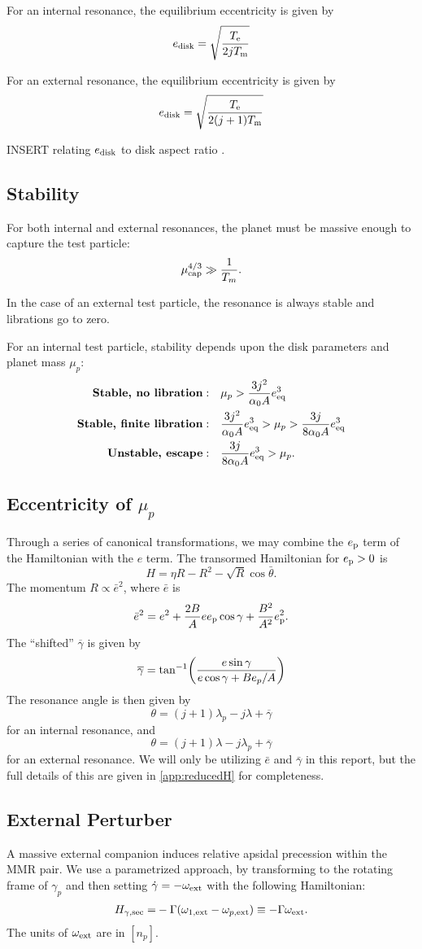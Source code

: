\documentclass{article}
\newcommand{\note}[1]{{\color{red} #1 }}
\newcommand{\edisk}{e_{\rm disk}}
\newcommand{\omext}{\omega_{\rm ext}}
\newcommand{\ep}{e_{\rm p}}
\newcommand{\Te}{T_{\rm e}}
\newcommand{\Tm}{T_{\rm m}}
\newcommand{\ebar}{\bar{e}}
\newcommand{\gammabar}{\bar{\gamma}}
\DeclarePairedDelimiter{\p}{(}{)}
\begin{document}
For an internal resonance, the equilibrium eccentricity is given by
\[ \edisk = \sqrt{\frac{\Te}{2j \Tm}} \]

For an external resonance, the equilibrium eccentricity is given by
\[ \edisk = \sqrt{\frac{\Te}{2(j+1) \Tm}} \]

\note{INSERT relating $e_{\rm disk}$ to disk aspect ratio}.

\subsection{Stability}
For both internal and external resonances, the planet must be massive enough
to capture the test particle:
\[\mu_{\rm cap}^{4/3}\gg \frac{1}{T_m}.\]

In the case of an external test particle, the resonance is always stable
and librations go to zero.

For an internal test particle, stability depends upon the disk parameters
and planet mass $\mu_p$:
\begin{align}
  \label{eq:stability}
\textbf{Stable, no libration}:&\quad \mu_p > \frac{3j^2}{\alpha_0 A} e_{\rm eq}^3 \nonumber\\
\textbf{Stable, finite libration}:&\quad \frac{3j^2}{\alpha_0 A} e_{\rm
 eq}^3 > \mu_p > \frac{3j}{8\alpha_0 A} e_{\rm eq}^3\nonumber\\
\textbf{Unstable, escape}:&\quad \frac{3j}{8\alpha_0 A} e_{\rm eq}^3 > \mu_p.
\end{align}

\subsection{Eccentricity of $\mu_p$}
Through a series of canonical transformations, we may combine the $\ep$
term of the Hamiltonian with the $e$ term.
The transormed Hamiltonian for $\ep > 0$ is
\[ H = \eta R - R^2 - \sqrt{R}\cos\bar{\theta}. \]
The momentum $R\propto \ebar^2$, where $\ebar$ is
\[ \ebar^2 = e^2 + \frac{2B}{A}e\ep\cos\gamma + \frac{B^2}{A^2}\ep^2. \]
The ``shifted'' $\overline{\gamma}$ is given by
\[ \overline{\gamma} = \tan^{-1}\p*{\frac{e\sin\gamma}{e\cos\gamma + Be_p/A}} \]
The resonance angle is then given by
\[ \theta = (j+1)\lambda_p - j\lambda + \overline{\gamma} \]
for an internal resonance, and
\[ \theta = (j+1)\lambda - j\lambda_p + \overline{\gamma} \]
for an external resonance.
We will only be utilizing $\ebar$ and $\gammabar$ in this report,
but the full details of this are given in \ref{app:reducedH} for completeness.
\subsection{External Perturber}\label{sec:extpert}
A massive external companion induces relative apsidal precession within the MMR pair.
We use a parametrized approach, by transforming to the rotating frame of $\gamma_p$ and
then setting $\dot\gamma = -\omext$ with the following Hamiltonian:
  \begin{align*}
    H_{\gamma,\rm sec} =& -\Gamma(\omega_{1,\rm ext} - \omega_{p,\rm ext}) \equiv -\Gamma\omext.  \\
  \end{align*}
  The units of $\omext$ are in $[n_p]$.
\end{document}
